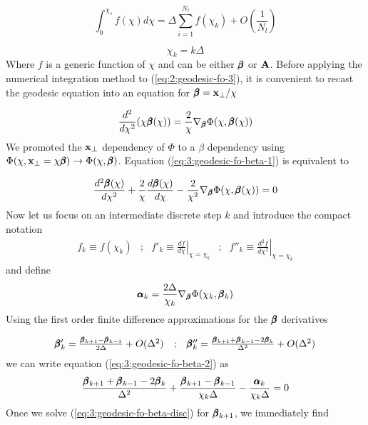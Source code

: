 \begin{equation}
\label{eq:3:int-fo}
\int_0^{\chi_s} f(\chi)d\chi = \Delta\sum_{i=1}^{N_l}f(\chi_k) + O\left(\frac{1}{N_l}\right)
\end{equation} 

\begin{equation}
\label{eq:3:int-steps}
\chi_k = k\Delta
\end{equation}  
%
Where $f$ is a generic function of $\chi$ and can be either $\pmb{\beta}$ or $\mathbf{A}$. Before applying the numerical integration method to (\ref{eq:2:geodesic-fo-3}), it is convenient to recast the geodesic equation into an equation for $\pmb{\beta}=\mathbf{x}_\perp/\chi$ 

\begin{equation}
\label{eq:3:geodesic-fo-beta-1}
\frac{d^2}{d\chi^2}(\chi\pmb{\beta}(\chi)) = \frac{2}{\chi}\nabla_{\pmb{\beta}}\Phi(\chi,\pmb{\beta}(\chi))
\end{equation} 
%
We promoted the $\mathbf{x}_\perp$ dependency of $\Phi$ to a $\beta$ dependency using $\Phi(\chi,\mathbf{x}_\perp=\chi\pmb{\beta})\rightarrow\Phi(\chi,\pmb{\beta})$. Equation (\ref{eq:3:geodesic-fo-beta-1}) is equivalent to 

\begin{equation}
\label{eq:3:geodesic-fo-beta-2}
\frac{d^2\pmb{\beta}(\chi)}{d\chi^2} + \frac{2}{\chi}\frac{d\pmb{\beta}(\chi)}{d\chi} - \frac{2}{\chi^2}\nabla_{\pmb{\beta}}\Phi(\chi,\pmb{\beta}(\chi)) = 0
\end{equation}
%
Now let us focus on an intermediate discrete step $k$ and introduce the compact notation 
\begin{equation}
\label{eq:3:compactnotation}
\begin{matrix}
f_k\equiv f(\chi_k) & ; & f'_k\equiv\left.\frac{df}{d\chi}\right\vert_{\chi=\chi_k} & ; & f''_k\equiv\left.\frac{d^2f}{d\chi^2}\right\vert_{\chi=\chi_k}
\end{matrix}
\end{equation}  
%
and define
\begin{equation}
\label{eq:3:alphak}
\pmb{\alpha}_k = \frac{2\Delta}{\chi_k}\nabla_{\pmb{\beta}}\Phi(\chi_k,\pmb{\beta}_k)
\end{equation}
%
Using the first order finite difference approximations for the $\pmb{\beta}$ derivatives

\begin{equation}
\label{eq:3:finitediff}
\begin{matrix}
\pmb{\beta}'_k = \frac{\pmb{\beta}_{k+1}-\pmb{\beta}_{k-1}}{2\Delta} + O(\Delta^2) & ; & \pmb{\beta}''_k = \frac{\pmb{\beta}_{k+1}+\pmb{\beta}_{k-1}-2\pmb{\beta}_k}{\Delta^2} + O(\Delta^2)
\end{matrix}
\end{equation}
%
we can write equation (\ref{eq:3:geodesic-fo-beta-2}) as 
\begin{equation}
\label{eq:3:geodesic-fo-beta-disc}
\frac{\pmb{\beta}_{k+1}+\pmb{\beta}_{k-1}-2\pmb{\beta}_k}{\Delta^2} + \frac{\pmb{\beta}_{k+1}-\pmb{\beta}_{k-1}}{\chi_k\Delta} - \frac{\pmb{\alpha}_k}{\chi_k\Delta} = 0
\end{equation} 
%
Once we solve (\ref{eq:3:geodesic-fo-beta-disc}) for $\pmb{\beta}_{k+1}$, we immediately find

